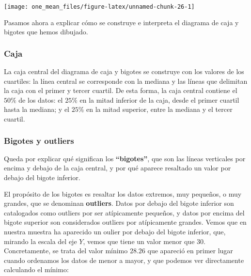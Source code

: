 \documentclass[
  title=normal,
  notoc,
  nobib,
  degree=mecinf]{mnye}
\newenvironment{Shaded}{\begin{snugshade}}{\end{snugshade}}
\newcommand{\FunctionTok}[1]{\textcolor[rgb]{0.00,0.00,0.00}{#1}}
\newcommand{\NormalTok}[1]{#1}
\newcommand{\SpecialCharTok}[1]{\textcolor[rgb]{0.00,0.00,0.00}{#1}}
\begin{document}
\begin{center}\texttt{[image: one\_mean\_files/figure-latex/unnamed-chunk-26-1]} \end{center}

Pasamos ahora a explicar cómo se construye e interpreta el diagrama de caja y bigotes que hemos dibujado.

\hypertarget{caja}{%
\subsubsection{Caja}\label{caja}}

La caja central del diagrama de caja y bigotes se construye con los valores de los cuartiles: la línea central se corresponde con la mediana y las líneas que delimitan la caja con el primer y tercer cuartil. De esta forma, la caja central contiene el \(50\%\) de los datos: el \(25\%\) en la mitad inferior de la caja, desde el primer cuartil hasta la mediana; y el \(25\%\) en la mitad superior, entre la mediana y el tercer cuartil.

\hypertarget{bigotes-y-outliers}{%
\subsubsection{Bigotes y outliers}\label{bigotes-y-outliers}}

Queda por explicar qué significan los \textbf{``bigotes''}, que son las líneas verticales por encima y debajo de la caja central, y por qué aparece resaltado un valor por debajo del bigote inferior.

El propósito de los bigotes es resaltar los datos extremos, muy pequeños, o muy grandes, que se denominan \textbf{outliers}. Datos por debajo del bigote inferior son catalogados como outliers por ser atípicamente pequeños, y datos por encima del bigote superior son considerados outliers por atípicamente grandes. Vemos que en nuestra muestra ha aparecido un oulier por debajo del bigote inferior, que, mirando la escala del eje \(Y\), vemos que tiene un valor menor que \(30\). Concretamente, se trata del valor mínimo \(28.26\) que apareció en primer lugar cuando ordenamos los datos de menor a mayor, y que podemos ver directamente calculando el mínimo:

\begin{Shaded}
\end{Shaded}
\end{document}

